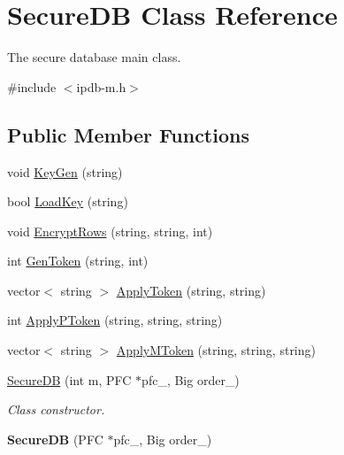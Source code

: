 \hypertarget{classSecureDB}{}\section{Secure\+DB Class Reference}
\label{classSecureDB}


The secure database main class.  




{\ttfamily \#include $<$ipdb-\/m.\+h$>$}

\subsection*{Public Member Functions}
\begin{DoxyCompactItemize}
\item 
void \hyperlink{classSecureDB_aa91f7d309988d84c6922d7e52162517c}{Key\+Gen} (string)
\item 
bool \hyperlink{classSecureDB_ac4626ebf45db1aeccd1a4698f22d92b5}{Load\+Key} (string)
\item 
void \hyperlink{classSecureDB_ae3c57379e37ba84f2f1bf8a29fba5bf2}{Encrypt\+Rows} (string, string, int)
\item 
int \hyperlink{classSecureDB_ac48eb9810677fd34c5c59b7537bcd970}{Gen\+Token} (string, int)
\item 
vector$<$ string $>$ \hyperlink{classSecureDB_a267eb02115e80bffd751bfe3e2fc566f}{Apply\+Token} (string, string)
\item 
int \hyperlink{classSecureDB_a24b57c65385caf873e389f1180d374e3}{Apply\+P\+Token} (string, string, string)
\item 
vector$<$ string $>$ \hyperlink{classSecureDB_a701ae7b9972bea6b4349ff35003a7a34}{Apply\+M\+Token} (string, string, string)
\item 
\hyperlink{classSecureDB_ab4c368e84ac078f9f598a8cd1da25ed7}{Secure\+DB} (int m, P\+FC $\ast$pfc\+\_\+, Big order\+\_\+)
\begin{DoxyCompactList}\small\item\em Class constructor. \end{DoxyCompactList}\item 
{\bfseries Secure\+DB} (P\+FC $\ast$pfc\+\_\+, Big order\+\_\+)\hypertarget{classSecureDB_a5ae766ecb788b9923d85f45ea96f922f}{}\label{classSecureDB_a5ae766ecb788b9923d85f45ea96f922f}

\end{DoxyCompactItemize}
